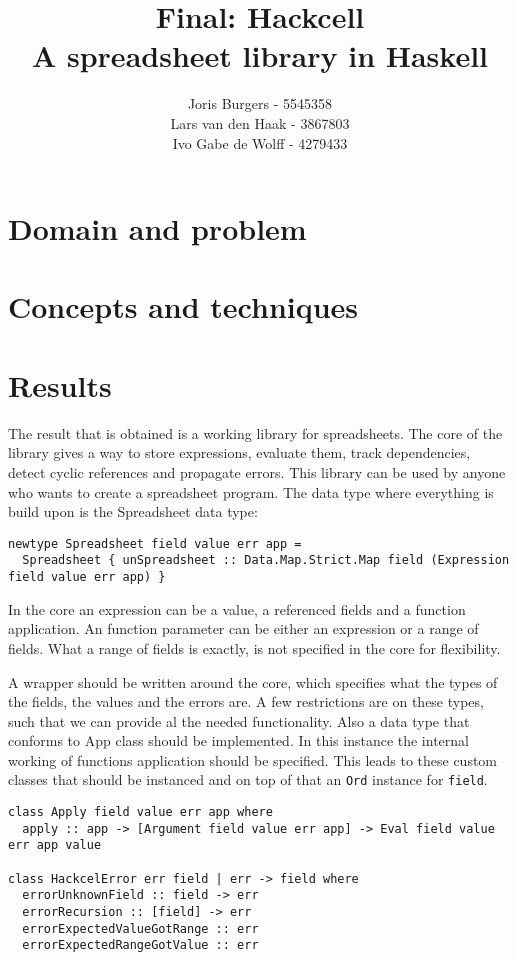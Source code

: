 \documentclass{article}
\title{
	Final: Hackcell \\
	\vskip 0.5cm
	\large{A spreadsheet library in Haskell}
}
\author{Joris Burgers - 5545358\\ Lars van den Haak - 3867803\\ Ivo Gabe de Wolff - 4279433}
\begin{document}
	\maketitle
	
	\section{Domain and problem}
	
	\section{Concepts and techniques}
	
	\section{Results}
	The result that is obtained is a working library for spreadsheets. The core of the library gives a way to store expressions, evaluate them, track dependencies, detect cyclic references and propagate errors. This library can be used by anyone who wants to create a spreadsheet program. The data type where everything is build upon is the Spreadsheet data type:
\begin{verbatim}	
newtype Spreadsheet field value err app =
  Spreadsheet { unSpreadsheet :: Data.Map.Strict.Map field (Expression field value err app) }
\end{verbatim}
	In the core an expression can be a value, a referenced fields and a function application. An function parameter can be either an expression or a range of fields. What a range of fields is exactly, is not specified in the core for flexibility.

	 A wrapper should be written around the core, which specifies what the types of the fields, the values and the errors are. A few restrictions are on these types, such that we can provide al the needed functionality. Also a data type that conforms to App class should be implemented. In this instance the internal working of functions application should be specified. This leads to these custom classes that should be instanced and on top of that an \texttt{Ord} instance for \texttt{field}.
\begin{verbatim}
class Apply field value err app where
  apply :: app -> [Argument field value err app] -> Eval field value err app value
  
class HackcelError err field | err -> field where
  errorUnknownField :: field -> err
  errorRecursion :: [field] -> err
  errorExpectedValueGotRange :: err
  errorExpectedRangeGotValue :: err
\end{verbatim}
	
\end{document}
